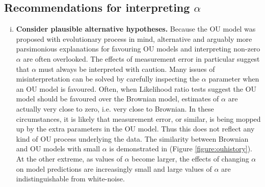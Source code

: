 \documentclass[a4paper,12pt]{article}
\begin{document}
  \subsection{Recommendations for interpreting $\alpha$}    
    \begin{enumerate}[(i)]
    \item \textbf{Consider plausible alternative hypotheses.}
    Because the OU model was proposed with evolutionary process in mind, alternative and arguably more parsimonious explanations for favouring OU models and interpreting non-zero $\alpha$ are often overlooked. 
    The effects of measurement error in particular suggest that $\alpha$ must always be interpreted with caution. 
    Many issues of misinterpretation can be solved by carefully inspecting the $\alpha$ parameter when an OU model is favoured. 
    Often, when Likelihood ratio tests suggest the OU model should be favoured over the Brownian model, estimates of $\alpha$ are actually very close to zero, i.e. very close to Brownian.
    In these circumstances, it is likely that measurement error, or similar, is being mopped up by the extra parameters in the OU model. 
    Thus this does not reflect any kind of OU process underlying the data. 
    The similarity between Brownian and OU models with small $\alpha$ is demonstrated in (Figure \ref{figure:ouhistory}). 
    At the other extreme, as values of $\alpha$ become larger, the effects of changing $\alpha$ on model predictions are increasingly small and large values of $\alpha$ are indistinguishable from white-noise. 
    

\end{enumerate}
\end{document}
